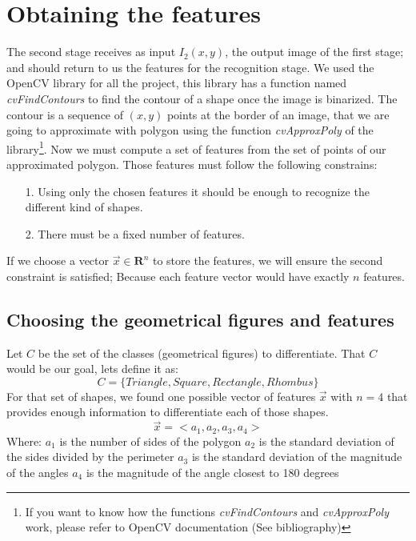 \documentclass[10pt,journal]{IEEEtran}
\begin{document}
	\section{Obtaining the features}
	The second stage receives as input $I_2(x,y)$, the output image of the first
	stage; and should return to us the features for the recognition stage. We used the 
	OpenCV library for all the project, this library has a function named
	\textit{cvFindContours} to find the contour of a shape once the image is
	binarized. The contour is a sequence of $(x,y)$ points at the border of an image,
	that we are going to approximate with polygon using the function 
	\textit{cvApproxPoly} of the library\footnote {If you want to know how the 
	functions \textit{cvFindContours} and \textit{cvApproxPoly} work, please 
	refer to OpenCV	documentation (See bibliography)}. \IEEEpubidadjcol
	Now we must compute a set of features from the set of points of our 
	approximated polygon. Those features must follow the following constrains:
	\begin{itemize}
		\item[1.] Using only the chosen features it should be enough to recognize the
			different kind of shapes.
		\item[2.] There must be a fixed number of features.
	\end{itemize}
	If we choose a vector $\vec{x} \in \mathbf{R}^n$ to store the features, we will
	ensure the second constraint is satisfied; Because each feature vector would have
	exactly $n$ features.
	
	\subsection{Choosing the geometrical figures and features}
	Let $C$ be the set of the classes (geometrical figures) to differentiate. That 
	$C$ would be our goal, lets define it as:
	\[C = \{ Triangle, Square, Rectangle, Rhombus \} \]
	For that set of shapes, we found one possible vector of features $\vec{x}$ with
	$n=4$ that provides enough information to differentiate each of those shapes.
	\[\vec{x} = <a_1,a_2,a_3,a_4> \]
	Where:\newline
	$a_1$ is the number of sides of the polygon\newline
	$a_2$ is the standard deviation of the sides divided by the perimeter\newline
	$a_3$ is the standard deviation of the magnitude of the angles\newline
	$a_4$ is the magnitude of the angle closest to 180 degrees\newline
	
\end{document}
